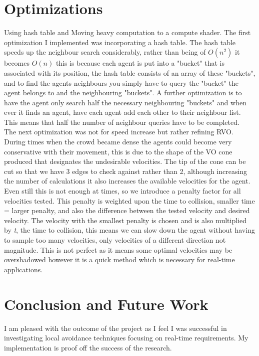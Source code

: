 \documentclass[a4paper,twocolumn]{article}
\begin{document}
\section{Optimizations}
Using hash table and Moving heavy computation to a compute shader. \cite{NOthman2013SP}
The first optimization I implemented was incorporating a hash table. The hash table speeds up the neighbour search considerably, rather than being of $O(n^{2})$ it becomes $O(n)$ this is because each agent is put into a "bucket" that is associated with its position, the hash table consists of an array of these "buckets", and to find the agents neighbours you simply have to query the "bucket" the agent belongs to and the neighbouring "buckets". A further optimization is to have the agent only search half the necessary neighbouring "buckets" and when ever it finds an agent, have each agent add each other to their neighbour list. This means that half the number of neighbour queries have to be completed.\\
The next optimization was not for speed increase but rather refining RVO. During times when the crowd became dense the agents could become very conservative with their movement, this is due to the shape of the VO cone produced that designates the undesirable velocities. The tip of the cone can be cut so that we have 3 edges to check against rather than 2\cite{AGuy2009CP}, although increasing the number of calculations it also increases the available velocities for the agent. Even still this is not enough at times, so we introduce a penalty factor for all velocities tested. This penalty is weighted upon the time to collision, smaller time = larger penalty, and also the difference between the tested velocity and desired velocity. The velocity with the smallest penalty is chosen and is also multiplied by \emph{t}, the time to collision, this means we can slow down the agent without having to sample too many velocities, only velocities of a different direction not magnitude. This is not perfect as it means some optimal velocities may be overshadowed however it is a quick method which is necessary for real-time applications.

\section{Conclusion and Future Work}
I am pleased with the outcome of the project as I feel I was successful in investigating local avoidance techniques focusing on real-time requirements. My implementation is proof off the success of the research.


%


\end{document}
